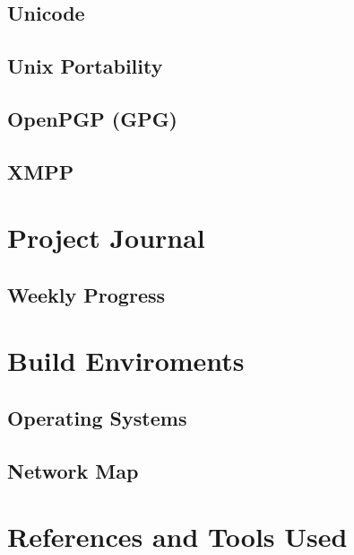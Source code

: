 \documentclass[a4paper,12pt]{report}
\begin{document}
\section{Unicode}

\section{Unix Portability}



\section{OpenPGP (GPG)}



\section{XMPP}


\chapter{Project Journal}

\label{chap:journal}

\section{Weekly Progress}

\label{sec:progress}

\chapter{Build Enviroments}

\section{Operating Systems}



\section{Network Map}




\chapter{References and Tools Used}
\end{document}
